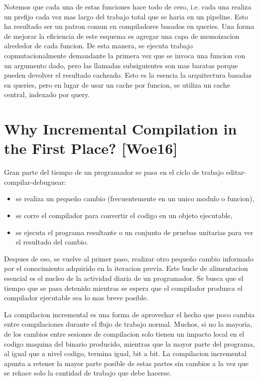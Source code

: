 \documentclass[12pt, a4paper]{report}
\begin{document}
Notemos que cada una de estas funciones hace todo de cero, i.e. cada una realiza un prefijo cada vez mas largo del trabajo total que se haria en un pipeline.
Esto ha resultado ser un patron comun en compiladores basados en queries.
Una forma de mejorar la eficiencia de este esquema es agregar una capa de memoizacion alrededor de cada funcion.
De esta manera, se ejecuta trabajo copmutacionalmente demandante la primera vez que se invoca una funcion con un argumento dado, pero las llamadas subsiguientes son mas baratas porque pueden devolver el resultado cacheado.
Esto es la esencia la arquitectura basadas en queries, pero en lugar de usar un cache por funcion, se utiliza un cache central, indexado por query.
\cite{olle_query_based}

\section*{Why Incremental Compilation in the First Place? [Woe16]}

Gran parte del tiempo de un programador se pasa en el ciclo de trabajo editar-compilar-debuguear:

\begin{itemize}
\item se realiza un pequeño cambio (frecuentemente en un unico modulo o funcion),
\item se corre el compilador para convertir el codigo en un objeto ejecutable,
\item se ejecuta el programa resultante o un conjunto de pruebas unitarias para ver el resultado del cambio.
\end{itemize}

Despues de eso, se vuelve al primer paso, realizar otro pequeño cambio informado por el conocimiento adquirido en la iteracion previa.
Este bucle de alimentacion esencial es el nucleo de la actividad diaria de un programador.
Se busca que el tiempo que se pasa detenido mientras se espera que el compilador produzca el compilador ejecutable sea lo mas breve posible.

La compilacion incremental es una forma de aprovechar el hecho que poco cambia entre compilaciones durante el flujo de trabajo normal.
Muchos, si no la mayoria, de los cambios entre sesiones de compilacion solo tienen un impacto local en el codigo maquina del binario producido, mientras que la mayor parte del programa, al igual que a nivel codigo, termina igual, bit a bit.
La compilacion incremental apunta a retener la mayor parte posible de estas partes sin cambios a la vez que se rehace solo la cantidad de trabajo que debe hacerse.
\cite{rust_blog_incremental_compilation}
\end{document}
